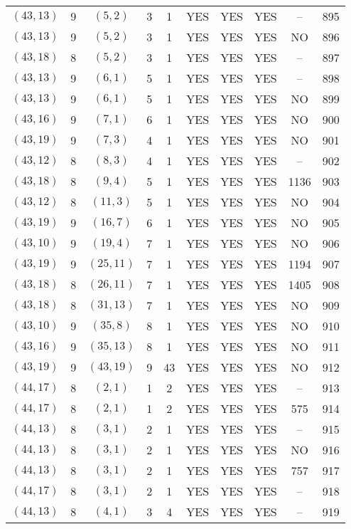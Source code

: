 \begin{longtable}{|c|c|c|c|c|c|c|c|c|c|}
$(43, 13)$ & 9 & $(5, 2)$ & 3 & 1 & YES & YES & YES & -- & 895\\
$(43, 13)$ & 9 & $(5, 2)$ & 3 & 1 & YES & YES & YES & NO & 896\\
$(43, 18)$ & 8 & $(5, 2)$ & 3 & 1 & YES & YES & YES & -- & 897\\
$(43, 13)$ & 9 & $(6, 1)$ & 5 & 1 & YES & YES & YES & -- & 898\\
$(43, 13)$ & 9 & $(6, 1)$ & 5 & 1 & YES & YES & YES & NO & 899\\
$(43, 16)$ & 9 & $(7, 1)$ & 6 & 1 & YES & YES & YES & NO & 900\\
$(43, 19)$ & 9 & $(7, 3)$ & 4 & 1 & YES & YES & YES & NO & 901\\
$(43, 12)$ & 8 & $(8, 3)$ & 4 & 1 & YES & YES & YES & -- & 902\\
$(43, 18)$ & 8 & $(9, 4)$ & 5 & 1 & YES & YES & YES & 1136 & 903\\
$(43, 12)$ & 8 & $(11, 3)$ & 5 & 1 & YES & YES & YES & NO & 904\\
$(43, 19)$ & 9 & $(16, 7)$ & 6 & 1 & YES & YES & YES & NO & 905\\
$(43, 10)$ & 9 & $(19, 4)$ & 7 & 1 & YES & YES & YES & NO & 906\\
$(43, 19)$ & 9 & $(25, 11)$ & 7 & 1 & YES & YES & YES & 1194 & 907\\
$(43, 18)$ & 8 & $(26, 11)$ & 7 & 1 & YES & YES & YES & 1405 & 908\\
$(43, 18)$ & 8 & $(31, 13)$ & 7 & 1 & YES & YES & YES & NO & 909\\
$(43, 10)$ & 9 & $(35, 8)$ & 8 & 1 & YES & YES & YES & NO & 910\\
$(43, 16)$ & 9 & $(35, 13)$ & 8 & 1 & YES & YES & YES & NO & 911\\
$(43, 19)$ & 9 & $(43, 19)$ & 9 & 43 & YES & YES & YES & NO & 912\\
$(44, 17)$ & 8 & $(2, 1)$ & 1 & 2 & YES & YES & YES & -- & 913\\
$(44, 17)$ & 8 & $(2, 1)$ & 1 & 2 & YES & YES & YES & 575 & 914\\
$(44, 13)$ & 8 & $(3, 1)$ & 2 & 1 & YES & YES & YES & -- & 915\\
$(44, 13)$ & 8 & $(3, 1)$ & 2 & 1 & YES & YES & YES & NO & 916\\
$(44, 13)$ & 8 & $(3, 1)$ & 2 & 1 & YES & YES & YES & 757 & 917\\
$(44, 17)$ & 8 & $(3, 1)$ & 2 & 1 & YES & YES & YES & -- & 918\\
$(44, 13)$ & 8 & $(4, 1)$ & 3 & 4 & YES & YES & YES & -- & 919\\

\end{longtable}
